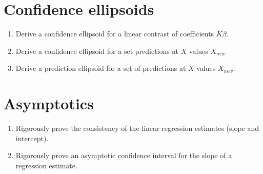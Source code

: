 \documentclass[12pt]{article}
\begin{document}
\section{Confidence ellipsoids}
\begin{enumerate}
\item Derive a confidence ellipsoid for a linear contrast of coefficients $K \beta$.
\item Derive a confidence ellipsoid for a set predictions at $X$ values $X_{new}$
\item Derive a prediction ellipsoid for a set of predictions at $X$ values $X_{new}$.
\end{enumerate}

\section{Asymptotics}
\begin{enumerate}
\item Rigorously prove the consistency of the linear regression estimates (slope and intercept).
\item Rigorously prove an asymptotic confidence interval for the slope of a regression estimate.
\end{enumerate}
\end{document}
